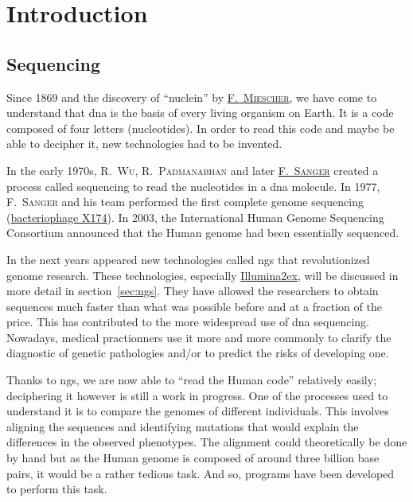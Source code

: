 \chapter{Introduction}


\section{Sequencing}
\label{sec:sequencing}
Since 1869 and the discovery of ``nuclein'' by \href{https://books.google.fr/books?id=YJRTAAAAcAAJ&pg=PA456&redir_esc=y#v=onepage&q&f=false}{F.~\textsc{Miescher}}, we have come to understand that \gls{dna} is the basis of every living organism on Earth.
It is a code composed of four letters (nucleotides).
In order to read this code and maybe be able to decipher it, new technologies had to be invented.

In the early 1970s, R.~\textsc{Wu}, R.~\textsc{Padmanabhan} and later \href{https://www.ncbi.nlm.nih.gov/pubmed/271968}{F.~\textsc{Sanger}} created a process called sequencing to read the nucleotides in a \gls{dna} molecule.
In 1977, F.~\textsc{Sanger} and his team performed the first complete genome sequencing (\href{https://www.ncbi.nlm.nih.gov/pubmed/870828}{bacteriophage \textphi X174}).
In 2003, the International Human Genome Sequencing Consortium announced that the Human genome had been essentially sequenced.

In the next years appeared new technologies called \gls{ngs} that revolutionized genome research.
These technologies, especially \href{http://www.illumina.com/}{Illumina\ttfamily\tiny\raise 2ex\hbox{\textregistered}}, will be discussed in more detail in section~\ref{sec:ngs}.
They have allowed the researchers to obtain sequences much faster than what was possible before and at a fraction of the price.
This has contributed to the more widespread use of \gls{dna} sequencing.
Nowadays, medical practionners use it more and more commonly to clarify the diagnostic of genetic pathologies and\slash\hspace{0pt}or to predict the risks of developing one.

Thanks to \gls{ngs}, we are now able to ``read the Human code'' relatively easily; deciphering it however is still a work in progress.
One of the processes used to understand it is to compare the genomes of different individuals.
This involves aligning the sequences and identifying mutations that would explain the differences in the observed phenotypes.
The alignment could theoretically be done by hand but as the Human genome is composed of around three billion base pairs, it would be a rather tedious task.
And so, programs have been developed to perform this task.


